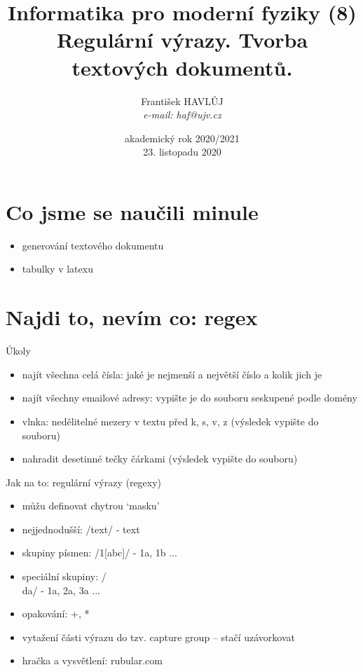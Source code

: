 \documentclass{beamer}
\title[IMF (8)]{Informatika pro moderní fyziky (8)\\Regulární výrazy. Tvorba textových dokumentů.}
\author[Franti\v{s}ek HAVL\r{U}J, ORF ÚJV Řež]{Franti\v{s}ek HAVL\r{U}J\\{\scriptsize \emph{e-mail: haf@ujv.cz}}}
\date{akademický rok 2020/2021\\23. listopadu 2020}
\institute[ORF ÚJV Řež]
{ÚJV Řež\\oddělení Reaktorové fyziky a podpory palivového cyklu}
\begin{document}
\begin{frame}
  \titlepage
\end{frame}

\begin{frame}
  \tableofcontents
\end{frame}

\section{Co jsme se naučili minule}

\begin{frame}{}
  \begin{itemize}
    \item generování textového dokumentu
    \item tabulky v latexu
  \end{itemize}
\end{frame}

\section{Najdi to, nevím co: regex}

\begin{frame}{Úkoly}
  \begin{itemize}
    \item najít všechna celá čísla: jaké je nejmenší a největší číslo a kolik jich je
    \item najít všechny emailové adresy: vypište je do souboru seskupené podle domény
    \item vlnka: nedělitelné mezery v textu před k, s, v, z (výsledek vypište do souboru)
    \item nahradit desetinné tečky čárkami (výsledek vypište do souboru)
  \end{itemize}
\end{frame}

\begin{frame}{Jak na to: regulární výrazy (regexy)}
  \begin{itemize}
    \item můžu definovat chytrou `masku'
    \item nejjednodušší: /text/ - text
    \item skupiny písmen: /1[abc]/ - 1a, 1b ...
    \item speciální skupiny: /\\da/ - 1a, 2a, 3a ...
    \item opakování: +, *
    \item vytažení části výrazu do tzv. capture group -- stačí uzávorkovat
    \item hračka a vysvětlení: rubular.com
  \end{itemize}
\end{frame}
\end{document}
